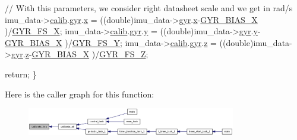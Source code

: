 \begin{DoxyCode}
  \textcolor{comment}{// With this parameters, we consider right datasheet scale and we get in
       rad/s}
  imu\_data->\hyperlink{structIMU__DATA__STRUCT_aeffe3c3c5a7191a5cef16e7aab6c3795}{calib}.\hyperlink{structIMU__DATA__STRUCT_1_1calibrated_a8a54aded6ce608f1b7d2b4a0c52c248b}{gyr}.\hyperlink{structDATA__XYZ__DOUBLE_a22868cc99a423900e7b82d015a5eb91f}{x} = ((double)imu\_data->\hyperlink{structIMU__DATA__STRUCT_a0c1ac26626e4434a2ee124a1928a23a1}{gyr}.\hyperlink{structDATA__XYZ_a54c1596e9f9969fd9c21e8458024ecfb}{x}-\hyperlink{calibration_2calibration_8h_a69780ffe3a15aad4121fed56d5e47377}{GYR\_BIAS\_X}
      )/\hyperlink{calibration_2calibration_8h_a8fe84f8c6d39f41d8622fd0cbce3a522}{GYR\_FS\_X};
  imu\_data->\hyperlink{structIMU__DATA__STRUCT_aeffe3c3c5a7191a5cef16e7aab6c3795}{calib}.\hyperlink{structIMU__DATA__STRUCT_1_1calibrated_a8a54aded6ce608f1b7d2b4a0c52c248b}{gyr}.\hyperlink{structDATA__XYZ__DOUBLE_a198a27b5df3b5b0bf461b0e481e22a82}{y} = ((double)imu\_data->\hyperlink{structIMU__DATA__STRUCT_a0c1ac26626e4434a2ee124a1928a23a1}{gyr}.\hyperlink{structDATA__XYZ_a94bbb1c889bf53eb6a5fffa2b39322cf}{y}-\hyperlink{calibration_2calibration_8h_a69780ffe3a15aad4121fed56d5e47377}{GYR\_BIAS\_X}
      )/\hyperlink{calibration_2calibration_8h_a4be2e0fa7596546bb4699862d0fe4183}{GYR\_FS\_Y};
  imu\_data->\hyperlink{structIMU__DATA__STRUCT_aeffe3c3c5a7191a5cef16e7aab6c3795}{calib}.\hyperlink{structIMU__DATA__STRUCT_1_1calibrated_a8a54aded6ce608f1b7d2b4a0c52c248b}{gyr}.\hyperlink{structDATA__XYZ__DOUBLE_a9556e8868c223ff3e28756ea18a284c0}{z} = ((double)imu\_data->\hyperlink{structIMU__DATA__STRUCT_a0c1ac26626e4434a2ee124a1928a23a1}{gyr}.\hyperlink{structDATA__XYZ_a69e89ab0ec6e5d72fc5d54f62cc07fb5}{z}-\hyperlink{calibration_2calibration_8h_a69780ffe3a15aad4121fed56d5e47377}{GYR\_BIAS\_X}
      )/\hyperlink{calibration_2calibration_8h_aaee2ece0c43cc20d7c531ab79dcd06c8}{GYR\_FS\_Z};
  
  \textcolor{keywordflow}{return};
\}
\end{DoxyCode}


Here is the caller graph for this function\-:
\nopagebreak
\begin{figure}[H]
\begin{center}
\leavevmode
\includegraphics[width=258pt]{group__calibrate_gaecfc81d152db2843b5d1517729804d63_icgraph}
\end{center}
\end{figure}


